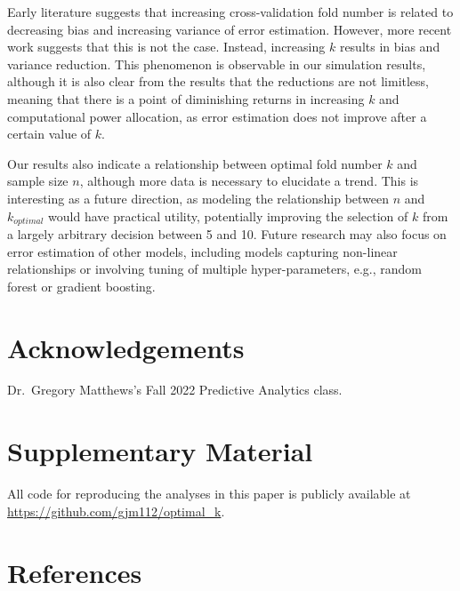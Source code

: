 \documentclass[
  12pt,
]{article}
\begin{document}
Early literature suggests that increasing cross-validation fold number
is related to decreasing bias and increasing variance of error
estimation. However, more recent work suggests that this is not the
case. Instead, increasing \(k\) results in bias and variance reduction.
This phenomenon is observable in our simulation results, although it is
also clear from the results that the reductions are not limitless,
meaning that there is a point of diminishing returns in increasing \(k\)
and computational power allocation, as error estimation does not improve
after a certain value of \(k\).

Our results also indicate a relationship between optimal fold number
\(k\) and sample size \(n\), although more data is necessary to
elucidate a trend. This is interesting as a future direction, as
modeling the relationship between \(n\) and \(k_{optimal}\) would have
practical utility, potentially improving the selection of \(k\) from a
largely arbitrary decision between 5 and 10. Future research may also
focus on error estimation of other models, including models capturing
non-linear relationships or involving tuning of multiple
hyper-parameters, e.g., random forest or gradient boosting.

\hypertarget{acknowledgements}{%
\section*{Acknowledgements}\label{acknowledgements}}

Dr.~Gregory Matthews's Fall 2022 Predictive Analytics class.

\hypertarget{supplementary-material}{%
\section*{Supplementary Material}\label{supplementary-material}}

All code for reproducing the analyses in this paper is publicly
available at \url{https://github.com/gjm112/optimal_k}.

\hypertarget{references}{%
\section*{References}\label{references}}
\end{document}
